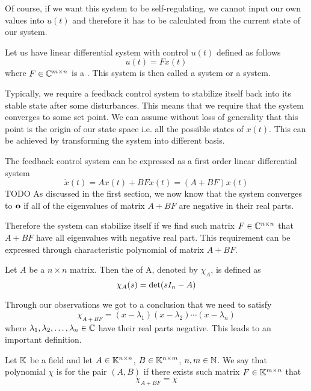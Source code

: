 Of course, if we want this system to be self-regulating, we cannot input our own values into $u(t)$ and therefore it has to be calculated from the current state of our system.

\begin{definition}
	Let us have linear differential system with control $u(t)$ defined as follows $$u(t)=Fx(t)$$ where $F\in\mathbb{C}^{m\times n}$ is a . This system is then called a  system or a  system.
\end{definition}

Typically, we require a feedback control system to stabilize itself back into its stable state after some disturbances. This means that we require that the system converges to some set point. We can assume without loss of generality that this point is the origin of our state space i.e. all the possible states of $x(t)$. This can be achieved by transforming the system into different basis.

The feedback control system can be expressed as a first order linear differential system $$\dot{x}(t)=Ax(t)+BFx(t)=(A+BF)x(t)$$ TODO As discussed in the first section, we now know that the system converges to $\textbf{o}$ if all of the eigenvalues of matrix $A+BF$ are negative in their real parts. 

Therefore the system can stabilize itself if we find such matrix $F \in \mathbb{C}^{n \times n}$ that $A+BF$ have all eigenvalues with negative real part. This requirement can be expressed through characteristic polynomial of matrix $A+BF$.

\begin{definition}
	Let $A$ be a $n\times n$ matrix. Then the  of A, denoted by $\chi_A$, is defined as $$\chi_A(s)=\textnormal{det}(sI_n-A)$$
\end{definition}

Through our observations we got to a conclusion that we need to satisfy $$\chi_{A+BF}=(x-\lambda_1)(x-\lambda_2)\cdots(x-\lambda_n)$$ where $\lambda_1,\lambda_2,\ldots,\lambda_n \in \mathbb{C}$ have their real parts negative. This leads to an important definition.

\begin{definition}
    Let $\mathbb{K}$ be a field and let $A \in \mathbb{K}^{n \times n}$, $B \in \mathbb{K}^{n \times m}$, $n,m \in \mathbb{N}$. We say that polynomial $\chi$ is  for the pair $(A,B)$ if there exists such matrix $F\in\mathbb{K}^{m \times n}$ that $$\chi_{A+BF}=\chi$$
\end{definition}

